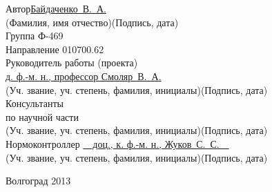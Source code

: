 \begin{titlepage}
    \begin{flushleft}
    Автор\hspace{.7cm}\underline{Байдаченко~В.~А.}\hfill\underline{\hspace{5cm}}\\
    \hspace{2cm}\footnotesize(Фамилия, имя отчество)\hspace{8cm}(Подпись, дата)\normalsize\\
    \vspace{.3cm}
    Группа Ф-469\\
    \vspace{.3cm}
    Направление 010700.62\\
    \vspace{.3cm}
    Руководитель работы (проекта)\\
    \underline{д. ф.-м. н., профессор Смоляр~В.~А.}\hfill\underline{\hspace{5cm}}\\
    \hspace{.4cm}\footnotesize(Уч. звание, уч. степень, фамилия, инициалы)\hspace{6.5cm}(Подпись, дата)\normalsize\\
    \vspace{.3cm}
    Консультанты\\
    по научной части \underline{\hspace{7cm}}\hfill\underline{\hspace{5cm}}\\
    \hspace{4cm}\footnotesize(Уч. звание, уч. степень, фамилия, инициалы)\hspace{3cm}(Подпись, дата)\normalsize\\
    \vspace{.3cm}
    Нормоконтроллер \underline{\ \ доц., к. ф.-м. н., Жуков~С.~С.\ \ }\hfill\underline{\hspace{5cm}}\\
    \hspace{4cm}\footnotesize(Уч. звание, уч. степень, фамилия, инициалы)\hspace{3cm}(Подпись, дата)\normalsize\\
    \end{flushleft}

    \vspace{\fill}

    \begin{center}
    Волгоград 2013
    \end{center}

    \end{titlepage}
